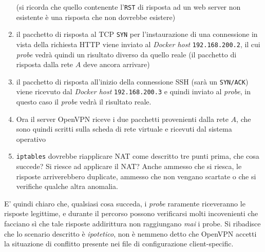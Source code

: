 \begin{enumerate}
  (si ricorda che quello contenente l'\texttt{RST} di risposta ad un web server non esistente
  è una risposta che non dovrebbe esistere)
  \item il pacchetto di risposta al TCP \texttt{SYN} per l'instaurazione di una connessione
  in vista della richiesta HTTP viene inviato al \textit{Docker host} \texttt{192.168.200.2},
  il cui \textit{probe} vedrà quindi un risultato diverso da quello reale (il pacchetto
  di risposta dalla rete $A$ deve ancora arrivare)
  \item il pacchetto di risposta all'inizio della connessione SSH (sarà un
  \texttt{SYN/ACK}) viene ricevuto dal \textit{Docker host} \texttt{192.168.200.3} e quindi
  inviato al \textit{probe}, in questo caso il \textit{probe} vedrà il risultato reale.
  \item Ora il server OpenVPN riceve i due pacchetti provenienti dalla rete $A$, che sono
  quindi scritti sulla scheda di rete virtuale e ricevuti dal sistema operativo
  \item \texttt{iptables} dovrebbe riapplicare NAT come descritto tre punti prima, che cosa
  succede? Si riesce ad applicare il NAT? Anche ammesso che si riesca, le risposte
  arriverebbero duplicate, ammesso che non vengano scartate o che si verifiche qualche
  altra anomalia.
\end{enumerate}
E' quindi chiaro che, qualsiasi cosa succeda, i \textit{probe} raramente riceveranno
le risposte legittime, e durante il percorso possono verificarsi molti incovenienti che
facciano sì che tale risposte addirittura non raggiungano \textit{mai} i probe. Si
ribadisce che lo scenario descritto è \textit{ipotetico}, non è nemmeno detto che OpenVPN
accetti la situazione di conflitto presente nei file di configurazione client-specific.

